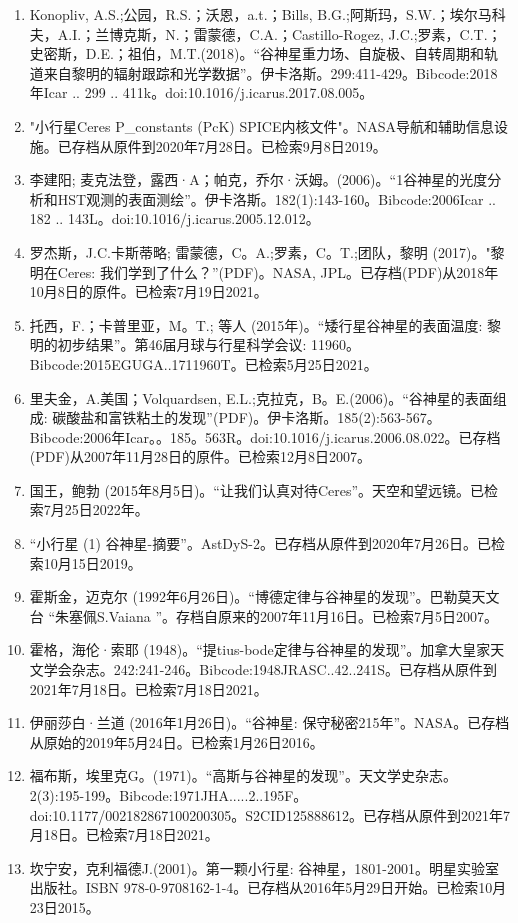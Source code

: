 \begin{enumerate}
\item Konopliv, A.S.;公园，R.S.；沃恩，a.t.；Bills, B.G.;阿斯玛，S.W.；埃尔马科夫，A.I.；兰博克斯，N.；雷蒙德，C.A.；Castillo-Rogez, J.C.;罗素，C.T.；史密斯，D.E.；祖伯，M.T.(2018)。“谷神星重力场、自旋极、自转周期和轨道来自黎明的辐射跟踪和光学数据”。伊卡洛斯。299:411-429。Bibcode:2018年Icar .. 299 .. 411k。doi:10.1016/j.icarus.2017.08.005。
\item "小行星Ceres P_constants (PcK) SPICE内核文件"。NASA导航和辅助信息设施。已存档从原件到2020年7月28日。已检索9月8日2019。
\item 李建阳; 麦克法登，露西·A；帕克，乔尔·沃姆。(2006)。“1谷神星的光度分析和HST观测的表面测绘”。伊卡洛斯。182(1):143-160。Bibcode:2006Icar .. 182 .. 143L。doi:10.1016/j.icarus.2005.12.012。
\item 罗杰斯，J.C.卡斯蒂略; 雷蒙德，C。A.;罗素，C。T.;团队，黎明 (2017)。"黎明在Ceres: 我们学到了什么？”(PDF)。NASA, JPL。已存档(PDF)从2018年10月8日的原件。已检索7月19日2021。
\item 托西，F.；卡普里亚，M。T.; 等人 (2015年)。“矮行星谷神星的表面温度: 黎明的初步结果”。第46届月球与行星科学会议: 11960。Bibcode:2015EGUGA..1711960T。已检索5月25日2021。
\item 里夫金，A.美国；Volquardsen, E.L.;克拉克，B。E.(2006)。“谷神星的表面组成: 碳酸盐和富铁粘土的发现”(PDF)。伊卡洛斯。185(2):563-567。Bibcode:2006年Icar。。185。563R。doi:10.1016/j.icarus.2006.08.022。已存档(PDF)从2007年11月28日的原件。已检索12月8日2007。
\item 国王，鲍勃 (2015年8月5日)。“让我们认真对待Ceres”。天空和望远镜。已检索7月25日2022年。
\item “小行星 (1) 谷神星-摘要”。AstDyS-2。已存档从原件到2020年7月26日。已检索10月15日2019。
\item 霍斯金，迈克尔 (1992年6月26日)。“博德定律与谷神星的发现”。巴勒莫天文台 “朱塞佩S.Vaiana ”。存档自原来的2007年11月16日。已检索7月5日2007。
\item 霍格，海伦·索耶 (1948)。“提tius-bode定律与谷神星的发现”。加拿大皇家天文学会杂志。242:241-246。Bibcode:1948JRASC..42..241S。已存档从原件到2021年7月18日。已检索7月18日2021。
\item 伊丽莎白·兰道 (2016年1月26日)。“谷神星: 保守秘密215年”。NASA。已存档从原始的2019年5月24日。已检索1月26日2016。
\item 福布斯，埃里克G。(1971)。“高斯与谷神星的发现”。天文学史杂志。2(3):195-199。Bibcode:1971JHA.....2..195F。doi:10.1177/002182867100200305。S2CID125888612。已存档从原件到2021年7月18日。已检索7月18日2021。 
\item 坎宁安，克利福德J.(2001)。第一颗小行星: 谷神星，1801-2001。明星实验室出版社。ISBN 978-0-9708162-1-4。已存档从2016年5月29日开始。已检索10月23日2015。

\end{enumerate}
